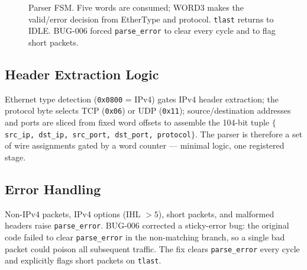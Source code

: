 \documentclass[12pt,twoside,openright]{book}
\begin{document}
\begin{figure}[H]
\centering
\footnotesize
{}
\caption{Parser FSM. Five words are consumed; WORD3 makes the valid/error decision from EtherType and
protocol. \texttt{tlast} returns to IDLE. BUG-006 forced \texttt{parse\_error} to clear every
cycle and to flag short packets.}
\label{fig:parserfsm}
\end{figure}

\subsection{Header Extraction Logic}

Ethernet type detection (\texttt{0x0800} = IPv4) gates IPv4 header extraction; the protocol byte
selects TCP (\texttt{0x06}) or UDP (\texttt{0x11}); source/destination addresses and ports are
sliced from fixed word offsets to assemble the 104-bit tuple
$\{$\texttt{src\_ip, dst\_ip, src\_port, dst\_port, protocol}$\}$. The parser is therefore a set of
wire assignments gated by a word counter --- minimal logic, one registered stage.

\subsection{Error Handling}

Non-IPv4 packets, IPv4 options (IHL $>5$), short packets, and malformed headers raise
\texttt{parse\_error}. BUG-006 corrected a sticky-error bug: the original code failed to clear
\texttt{parse\_error} in the non-matching branch, so a single bad packet could poison all
subsequent traffic. The fix clears \texttt{parse\_error} every cycle and explicitly flags short
packets on \texttt{tlast}.
\end{document}
